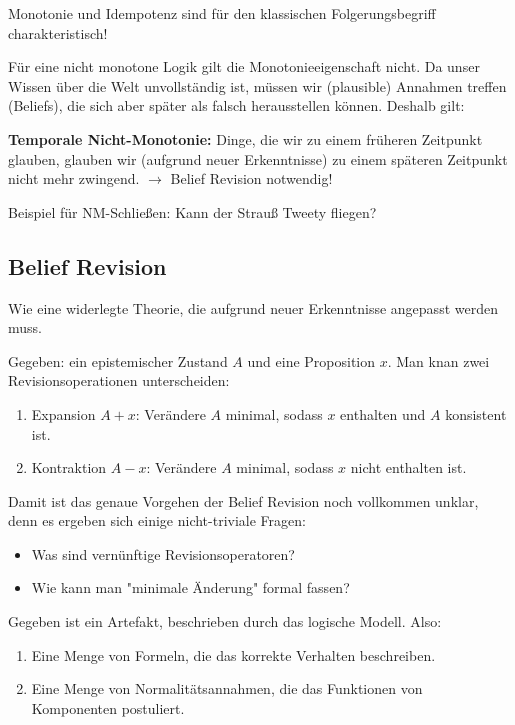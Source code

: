 \documentclass[runningheads,deutsch]{llncs}
\begin{document}
Monotonie und Idempotenz sind für den klassischen Folgerungsbegriff charakteristisch!

Für eine nicht monotone Logik gilt die Monotonieeigenschaft nicht. Da unser Wissen über die Welt unvollständig ist, müssen wir (plausible) Annahmen treffen (Beliefs), die sich aber später als falsch herausstellen können. Deshalb gilt:

\par
\textbf{Temporale Nicht-Monotonie:} Dinge, die wir zu einem früheren Zeitpunkt glauben, glauben wir (aufgrund neuer Erkenntnisse) zu einem späteren Zeitpunkt nicht mehr zwingend. $\rightarrow$ Belief Revision notwendig!

Beispiel für NM-Schließen: Kann der Strauß Tweety fliegen?

\subsection{Belief Revision}

Wie eine widerlegte Theorie, die aufgrund neuer Erkenntnisse angepasst werden muss.

Gegeben: ein epistemischer Zustand $A$ und eine Proposition $x$. Man knan zwei Revisionsoperationen unterscheiden:

\begin{enumerate}
    \item Expansion $A + x$: Verändere $A$ minimal, sodass $x$ enthalten und $A$ konsistent ist.
    \item Kontraktion $A - x$: Verändere $A$ minimal, sodass $x$ nicht enthalten ist.
\end{enumerate}

Damit ist das genaue Vorgehen der Belief Revision noch vollkommen unklar, denn es ergeben sich einige nicht-triviale Fragen:

\begin{itemize}
    \item Was sind vernünftige Revisionsoperatoren?
    \item Wie kann man "minimale Änderung" formal fassen?
\end{itemize}

Gegeben ist ein Artefakt, beschrieben durch das logische Modell. Also:

\begin{enumerate}
    \item Eine Menge von Formeln, die das korrekte Verhalten beschreiben.
    \item Eine Menge von Normalitätsannahmen, die das Funktionen von Komponenten postuliert.
\end{enumerate}
\end{document}
